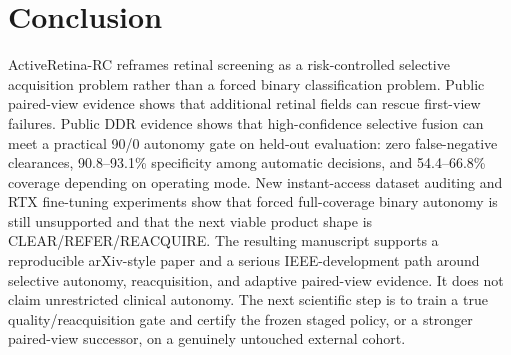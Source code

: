 \documentclass[journal]{IEEEtran}
\begin{document}
\section{Conclusion}
ActiveRetina-RC reframes retinal screening as a risk-controlled selective acquisition problem rather than a forced binary classification problem. Public paired-view evidence shows that additional retinal fields can rescue first-view failures. Public DDR evidence shows that high-confidence selective fusion can meet a practical 90/0 autonomy gate on held-out evaluation: zero false-negative clearances, 90.8--93.1\% specificity among automatic decisions, and 54.4--66.8\% coverage depending on operating mode. New instant-access dataset auditing and RTX fine-tuning experiments show that forced full-coverage binary autonomy is still unsupported and that the next viable product shape is CLEAR/REFER/REACQUIRE. The resulting manuscript supports a reproducible arXiv-style paper and a serious IEEE-development path around selective autonomy, reacquisition, and adaptive paired-view evidence. It does not claim unrestricted clinical autonomy. The next scientific step is to train a true quality/reacquisition gate and certify the frozen staged policy, or a stronger paired-view successor, on a genuinely untouched external cohort.
\end{document}
